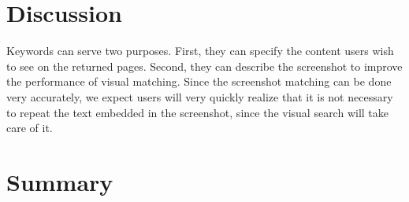 \documentclass{www2010-submission}
\begin{document}
\section{Discussion}

Keywords can serve two purposes. First, they can specify the
content users wish to see on the returned pages. Second, they can
describe the screenshot to improve the performance of visual
matching. Since the screenshot matching can be done very
accurately, we expect users will very quickly realize that it is
not necessary to repeat the text embedded in the screenshot, since
the visual search will take care of it.


\section{Summary}



\balancecolumns %
\end{document}
